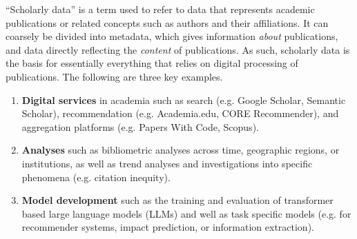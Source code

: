 ``Scholarly data'' is a term used to refer to data that represents academic publications or related concepts such as authors and their affiliations. It can coarsely be divided into metadata, which gives information \emph{about} publications, and data directly reflecting the \emph{content} of publications.
As such, scholarly data is the basis for essentially everything that relies on digital processing of publications. The following are three key examples.
\begin{enumerate}
    \item \textbf{Digital services} in academia such as search (e.g. Google Scholar, Semantic Scholar), recommendation (e.g. Academia.edu, CORE Recommender), and aggregation platforms (e.g. Papers With Code, Scopus).  %
    \item \textbf{Analyses} such as bibliometric analyses across time, geographic regions, or institutions, as well as trend analyses and investigations into specific phenomena (e.g. citation inequity).
    \item \textbf{Model development} such as the training and evaluation of transformer based large language models (LLMs) and well as task specific models (e.g. for recommender systems, impact prediction, or information extraction).
\end{enumerate}


